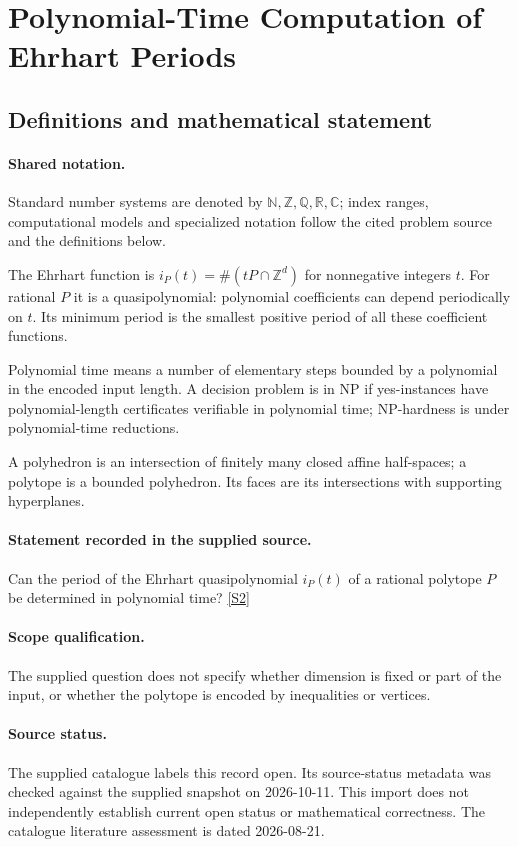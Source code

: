 \documentclass[11pt]{article}
\newcommand{\sref}[2]{\hyperlink{source:#1:#2}{[S#2]}}
\begin{document}
\section{Polynomial-Time Computation of Ehrhart Periods}\label{statement}

\subsection{Definitions and mathematical statement}

\paragraph{Shared notation.}Standard number systems are denoted by $\mathbb N,\mathbb Z,\mathbb Q,\mathbb R,\mathbb C$; index ranges, computational models and specialized notation follow the cited problem source and the definitions below.


The Ehrhart function is $i_P(t)=\#(tP\cap\mathbb Z^d)$ for nonnegative integers $t$. For rational $P$ it is a quasipolynomial: polynomial coefficients can depend periodically on $t$. Its minimum period is the smallest positive period of all these coefficient functions.

Polynomial time means a number of elementary steps bounded by a polynomial in the encoded input length. A decision problem is in $\mathrm{NP}$ if yes-instances have polynomial-length certificates verifiable in polynomial time; NP-hardness is under polynomial-time reductions.

A polyhedron is an intersection of finitely many closed affine half-spaces; a polytope is a bounded polyhedron. Its faces are its intersections with supporting hyperplanes.
\paragraph{Statement recorded in the supplied source.}
Can the period of the Ehrhart quasipolynomial $i_P(t)$ of a rational polytope $P$ be determined in polynomial time? \sref{statement}{2}
\paragraph{Scope qualification.}
The supplied question does not specify whether dimension is fixed or part of the input, or whether the polytope is encoded by inequalities or vertices.
\paragraph{Source status.}
The supplied catalogue labels this record open. Its source-status metadata was checked against the supplied snapshot on 2026-10-11. This import does not independently establish current open status or mathematical correctness. The catalogue literature assessment is dated 2026-08-21.
\end{document}
